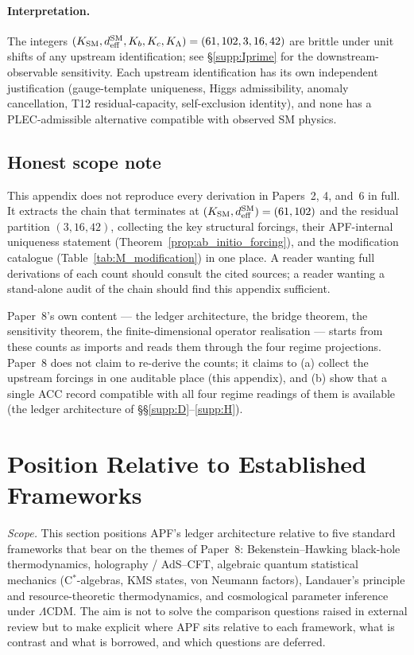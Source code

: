 \documentclass[11pt]{article}
\theoremstyle{plain}
\theoremstyle{definition}
\theoremstyle{remark}
\begin{document}
\paragraph{Interpretation.}  The integers $(K_{\rm SM}, d_{\rm eff}^{\rm SM}, K_b, K_c, K_\Lambda) = (61, 102, 3, 16, 42)$ are brittle under unit shifts of any upstream identification; see \S\ref{supp:Iprime} for the downstream-observable sensitivity.  Each upstream identification has its own independent justification (gauge-template uniqueness, Higgs admissibility, anomaly cancellation, T12 residual-capacity, self-exclusion identity), and none has a PLEC-admissible alternative compatible with observed SM physics.

\subsection{Honest scope note}\label{supp:M8}

This appendix does not reproduce every derivation in Papers~2, 4, and~6 in full.  It extracts the chain that terminates at $(K_{\rm SM}, d_{\rm eff}^{\rm SM}) = (61, 102)$ and the residual partition $(3, 16, 42)$, collecting the key structural forcings, their APF-internal uniqueness statement (Theorem~\ref{prop:ab_initio_forcing}), and the modification catalogue (Table~\ref{tab:M_modification}) in one place.  A reader wanting full derivations of each count should consult the cited sources; a reader wanting a stand-alone audit of the chain should find this appendix sufficient.

Paper~8's own content --- the ledger architecture, the bridge theorem, the sensitivity theorem, the finite-dimensional operator realisation --- starts from these counts as imports and reads them through the four regime projections.  Paper~8 does not claim to re-derive the counts; it claims to (a) collect the upstream forcings in one auditable place (this appendix), and (b) show that a single ACC record compatible with all four regime readings of them is available (the ledger architecture of \S\S\ref{supp:D}--\ref{supp:H}).

\section{Position Relative to Established Frameworks}\label{supp:N}

\noindent\textit{Scope.}  This section positions APF's ledger architecture relative to five standard frameworks that bear on the themes of Paper~8: Bekenstein--Hawking black-hole thermodynamics, holography / AdS--CFT, algebraic quantum statistical mechanics (C$^*$-algebras, KMS states, von Neumann factors), Landauer's principle and resource-theoretic thermodynamics, and cosmological parameter inference under $\Lambda$CDM.  The aim is not to solve the comparison questions raised in external review but to make explicit where APF sits relative to each framework, what is contrast and what is borrowed, and which questions are deferred.
\end{document}
